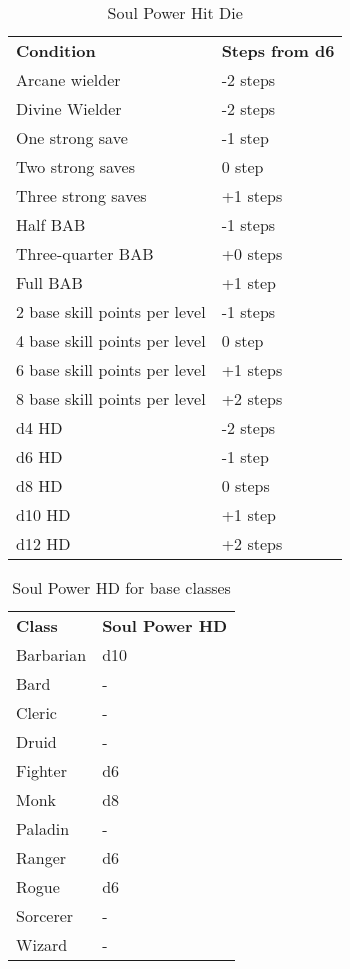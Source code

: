 \begin{table}[!htb]
  \caption{Soul Power Hit Die}
  \begin{tabular}{p{5cm} l}
    \textbf{Condition}            & \textbf{Steps from d6} \\
    Arcane wielder                & -2 steps \\
    Divine Wielder                & -2 steps \\
    One strong save               & -1 step \\
    Two strong saves              &  0 step \\
    Three strong saves            & +1 steps \\
    Half BAB                      & -1 steps \\
    Three-quarter BAB             & +0 steps \\
    Full BAB                      & +1 step \\
    2 base skill points per level & -1 steps \\
    4 base skill points per level &  0 step \\
    6 base skill points per level & +1 steps \\
    8 base skill points per level & +2 steps \\
    d4 HD                         & -2 steps \\
    d6 HD                         & -1 step \\
    d8 HD                         & 0 steps \\
    d10 HD                        & +1 step \\
    d12 HD                        & +2 steps
  \end{tabular}
\end{table}

\begin{table}[!htb]
  \caption{Soul Power HD for base classes}
  \begin{tabular}{p{5cm} l}
    \textbf{Class} & \textbf{Soul Power HD} \\
    Barbarian      & d10         \\
    Bard           & -           \\
    Cleric         & -           \\
    Druid          & -           \\
    Fighter        & d6          \\
    Monk           & d8          \\
    Paladin        & -           \\
    Ranger         & d6          \\
    Rogue          & d6          \\
    Sorcerer       & -           \\
    Wizard         & -           \\
  \end{tabular}
\end{table}

